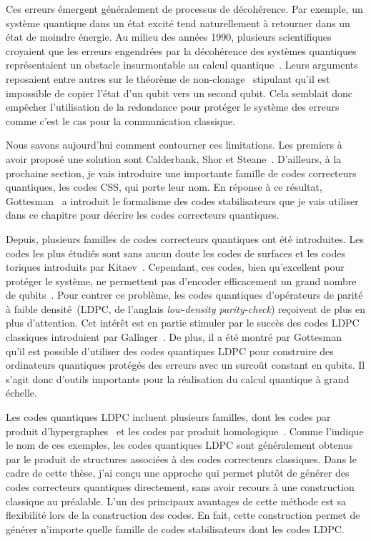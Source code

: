 Ces erreurs émergent généralement de processus de décohérence.
Par exemple,
un système quantique dans un état excité tend naturellement à retourner dans un état de moindre énergie.
Au milieu des années 1990,
plusieurs scientifiques croyaient que
les erreurs engendrées par la décohérence des systèmes quantiques
représentaient un obstacle insurmontable au calcul quantique~\cite{unruh_maintaining_1995, palma_quantum_1996, landauer_is_1995, chuang_quantum_1995}.
Leurs arguments reposaient entre autres sur le théorème de non-clonage~\cite{wootters_single_1982}
stipulant qu'il est impossible de copier l'état d'un qubit vers un second qubit.
Cela semblait donc empêcher l'utilisation de la redondance pour 
protéger le système des erreurs comme c'est le cas pour la communication classique.

Nous savons aujourd'hui comment contourner ces limitations. 
Les premiers à avoir proposé une solution sont Calderbank, Shor et Steane~\cite{calderbank_good_1996, steane_multiple-particle_nodate}.
D'ailleurs, à la prochaine section,
je vais introduire une importante famille de codes correcteurs quantiques, les codes CSS, qui porte leur nom.
En réponse à ce résultat, Gottesman~\cite{gottesman_stabilizer_1997} a introduit le formalisme des codes stabilisateurs
que je vais utiliser dans ce chapitre pour décrire les codes correcteurs quantiques.

Depuis,
plusieurs familles de codes correcteurs quantiques ont été introduites.
Les codes les plus étudiés sont sans aucun doute les codes de surfaces et 
les codes toriques introduits par Kitaev~\cite{kitaev_fault-tolerant_2003}.
Cependant,
ces codes, bien qu'excellent pour protéger le système,
ne permettent pas d'encoder efficacement un grand nombre de qubits~\cite{bravyi_tradeoffs_2010}.
Pour contrer ce problème,
les codes quantiques d'opérateurs de parité à faible 
densité~(LDPC, de l'anglais \textit{low-density parity-check})
reçoivent de plus en plus d'attention.
Cet intérêt est en partie stimuler par le succès des codes LDPC classiques introduient
par Gallager~\cite{gallager_low-density_1962}.
De plus, il a été montré par Gottesman~\cite{gottesman_fault-tolerant_2013}
qu'il est possible d'utiliser des codes quantiques LDPC pour 
construire des ordinateurs quantiques protégés des erreurs avec 
un surcoût constant en qubits.
Il s'agit donc d'outils importants pour la réalisation du calcul quantique à grand échelle.

Les codes quantiques LDPC incluent plusieurs familles,
dont les codes par produit d'hypergraphes~\cite{tillich_quantum_2014}
et les codes par produit homologique~\cite{bravyi_homological_2014}.
Comme l'indique le nom de ces exemples,
les codes quantiques LDPC sont généralement obtenus par le produit 
de structures associées à des codes correcteurs classiques.
Dans le cadre de cette thèse,
j'ai conçu une approche qui permet plutôt de générer des codes correcteurs quantiques
directement,
sans avoir recours à une construction classique au préalable.
L'un des principaux avantages de cette méthode est sa flexibilité 
lors de la construction des codes.
En fait,
cette construction permet de générer n'importe quelle famille de codes stabilisateurs
dont les codes LDPC.

